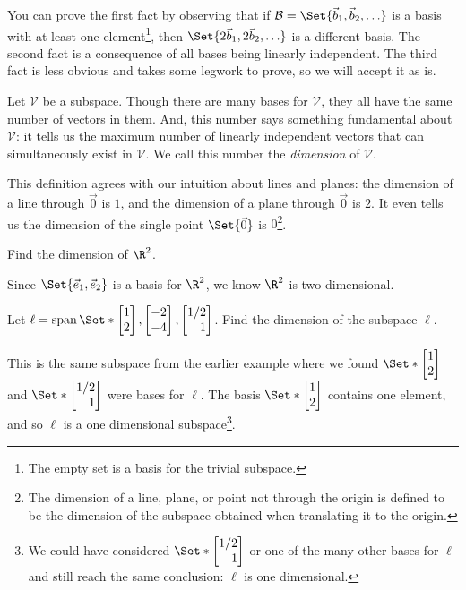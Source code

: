 You can prove the first fact by observing that if $\mathcal B=\Set{\vec b_1,\vec b_2,\ldots}$ is a basis
with at least one element\footnote{ The empty set is a basis for the trivial subspace.}, then
$\Set{2\vec b_1,2\vec b_2,\ldots}$ is a different basis. The second fact is a consequence of all bases 
being linearly independent. The third fact is less obvious and takes some legwork to prove, so we will accept it
as is.


Let $\mathcal V$ be a subspace. Though there are many bases for $\mathcal V$, they all
have the same number of vectors in them. And, this number says something fundamental about $\mathcal V$:
it tells us the maximum number of linearly independent vectors that can simultaneously exist in $\mathcal V$.
We call this number the \emph{dimension} of $\mathcal V$.


This definition agrees with our intuition about lines and planes: the dimension of a line through $\vec 0$ is $1$, and
the dimension of a plane through $\vec 0$ is $2$. It even tells us the dimension of the single point $\Set{\vec 0}$
is $0$\footnote{ The dimension of a line, plane, or point
not through the origin is defined to be the dimension of the subspace obtained
when translating it to the origin.}.

\begin{example}
	Find the dimension of $\R^2$.

	Since $\Set{\xhat, \yhat}$ is a basis for $\R^2$, we know $\R^2$ is
	two dimensional.
\end{example}

\begin{example}
	Let $\ell=\Span\Set*{\mat{1\\2},\mat{-2\\-4}, \mat{1/2\\1}}$.
	Find the dimension of the subspace $\ell$.

	This is the same subspace from the earlier example where we found
	$\Set*{\mat{1\\2}}$ and $\Set*{\mat{1/2\\1}}$
	were bases for $\ell$.
	The basis $\Set*{\mat{1\\2}}$ contains one element, and so
	$\ell$ is a one dimensional subspace\footnote{
	We could have considered $\Set*{\mat{1/2\\1}}$ or one of the many other bases for $\ell$
	and still reach the same conclusion: $\ell$ is one dimensional.}.
\end{example}

